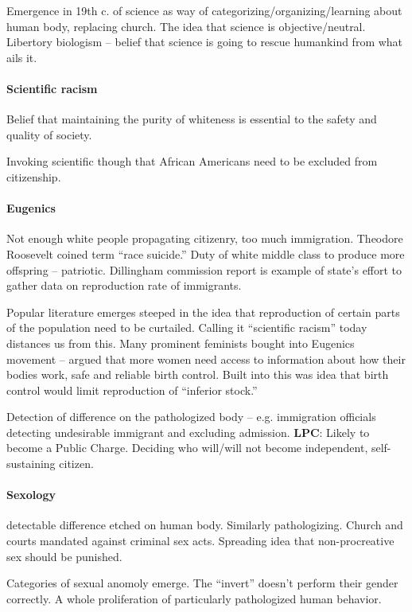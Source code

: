 Emergence in 19th c. of science as way of categorizing/organizing/learning about human body, replacing church. The idea that science is objective/neutral. Libertory biologism -- belief that science is going to rescue humankind from what ails it.

\paragraph{Scientific racism} Belief that maintaining the purity of whiteness is essential to the safety and quality of society.

Invoking scientific though that African Americans need to be excluded from citizenship.

\paragraph{Eugenics} Not enough white people propagating citizenry, too much immigration. Theodore Roosevelt coined term ``race suicide.'' Duty of white middle class to produce more offspring -- patriotic. Dillingham commission report is example of state's effort to gather data on reproduction rate of immigrants.

Popular literature emerges steeped in the idea that reproduction of certain parts of the population need to be curtailed. Calling it ``scientific racism'' today distances us from this. Many prominent feminists bought into Eugenics movement -- argued that more women need access to information about how their bodies work, safe and reliable birth control. Built into this was idea that birth control would limit reproduction of ``inferior stock.''

Detection of difference on the pathologized body -- e.g. immigration officials detecting undesirable immigrant and excluding admission. \textbf{LPC}: Likely to become a Public Charge. Deciding who will/will not become independent, self-sustaining citizen.

\paragraph{Sexology} detectable difference etched on human body. Similarly pathologizing. Church and courts mandated against criminal sex acts. Spreading idea that non-procreative sex should be punished.

Categories of sexual anomoly emerge. The ``invert'' doesn't perform their gender correctly. A whole proliferation of particularly pathologized human behavior.

